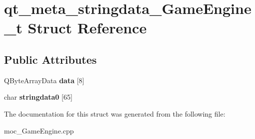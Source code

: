 \hypertarget{structqt__meta__stringdata__GameEngine__t}{}\section{qt\+\_\+meta\+\_\+stringdata\+\_\+\+Game\+Engine\+\_\+t Struct Reference}
\label{structqt__meta__stringdata__GameEngine__t}
\subsection*{Public Attributes}
\begin{DoxyCompactItemize}
\item 
Q\+Byte\+Array\+Data {\bfseries data} \mbox{[}8\mbox{]}\hypertarget{structqt__meta__stringdata__GameEngine__t_a011ffd9cd6cbbd9539314be8c9786d27}{}\label{structqt__meta__stringdata__GameEngine__t_a011ffd9cd6cbbd9539314be8c9786d27}

\item 
char {\bfseries stringdata0} \mbox{[}65\mbox{]}\hypertarget{structqt__meta__stringdata__GameEngine__t_a4fcab7fae1a0dff7923e0662d1b906a7}{}\label{structqt__meta__stringdata__GameEngine__t_a4fcab7fae1a0dff7923e0662d1b906a7}

\end{DoxyCompactItemize}


The documentation for this struct was generated from the following file\+:\begin{DoxyCompactItemize}
\item 
moc\+\_\+\+Game\+Engine.\+cpp\end{DoxyCompactItemize}
